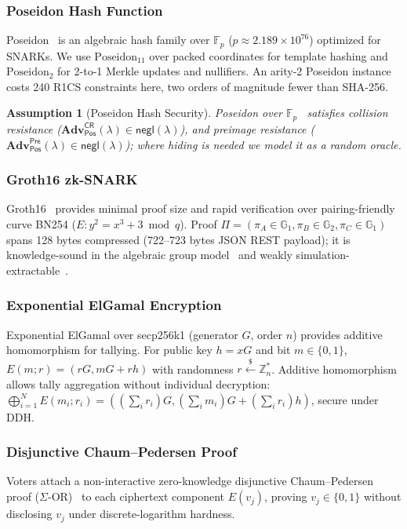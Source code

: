 \documentclass[10pt,letterpaper,journal]{IEEEtran}
\newtheorem{assumption}[theorem]{Assumption}
\begin{document}
\subsubsection{Poseidon Hash Function}
Poseidon~\cite{Grassi2021} is an algebraic hash family over $\mathbb{F}_p$ ($p \approx 2.189 \times 10^{76}$) optimized for SNARKs. We use $\text{Poseidon}_{11}$ over packed coordinates for template hashing and $\text{Poseidon}_2$ for 2-to-1 Merkle updates and nullifiers. An arity-2 Poseidon instance costs 240 R1CS constraints here, two orders of magnitude fewer than SHA-256.

\begin{assumption}[Poseidon Hash Security]
\label{asm:poseidon}
Poseidon over $\mathbb{F}_p$~\cite{Grassi2021} satisfies collision resistance ($\mathbf{Adv}^{\mathsf{CR}}_{\mathsf{Pos}}(\lambda) \in \mathsf{negl}(\lambda)$), and preimage resistance ($\mathbf{Adv}^{\mathsf{Pre}}_{\mathsf{Pos}}(\lambda) \in \mathsf{negl}(\lambda)$); where hiding is needed we model it as a random oracle.
\end{assumption}

\subsubsection{Groth16 zk-SNARK}
Groth16~\cite{Groth2016} provides minimal proof size and rapid verification over pairing-friendly curve BN254 ($E: y^2 = x^3 + 3 \bmod q$). Proof $\Pi = (\pi_A \in \mathbb{G}_1, \pi_B \in \mathbb{G}_2, \pi_C \in \mathbb{G}_1)$ spans 128 bytes compressed (722--723 bytes JSON REST payload); it is knowledge-sound in the algebraic group model~\cite{Fuchsbauer2018} and weakly simulation-extractable~\cite{Baghery2021}.

\subsubsection{Exponential ElGamal Encryption}
Exponential ElGamal over secp256k1 (generator $G$, order $n$) provides additive homomorphism for tallying. For public key $h = xG$ and bit $m \in \{0, 1\}$, $E(m; r) = (rG, mG + rh)$ with randomness $r \xleftarrow{\$} \mathbb{Z}_n^*$. Additive homomorphism allows tally aggregation without individual decryption: $\bigoplus_{i=1}^{N} E(m_i; r_i) = ((\sum_i r_i)G, (\sum_i m_i)G + (\sum_i r_i)h)$, secure under DDH.

\subsubsection{Disjunctive Chaum--Pedersen Proof}
Voters attach a non-interactive zero-knowledge disjunctive Chaum--Pedersen proof ($\Sigma$-OR)~\cite{ChaumPedersen1992} to each ciphertext component $E(v_j)$, proving $v_j \in \{0, 1\}$ without disclosing $v_j$ under discrete-logarithm hardness.
\end{document}

